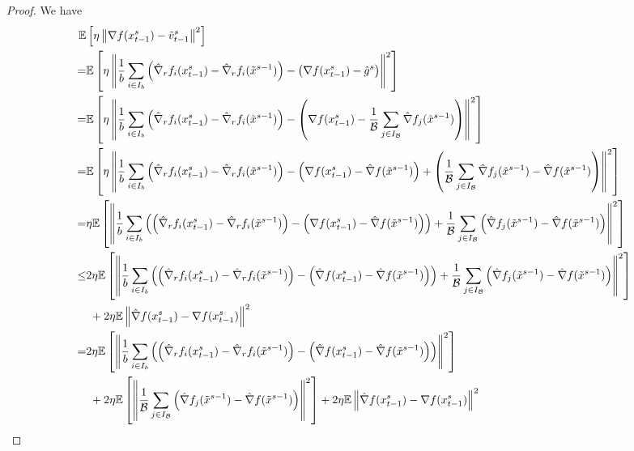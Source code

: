 \documentclass{article}
\newcommand*{\E}{\mathbb{E}}
\newcommand{\norm}[1]{\left\lVert#1\right\rVert}
\theoremstyle{definition}
\theoremstyle{remark}
\begin{document}
\begin{proof}
We have
\begin{align}
  \E&\left[\eta\norm{\nabla f(x_{t-1}^s)-{\tilde{v}_{t-1}^s}}^2\right]\notag\\
   =&\E\left[\eta\norm{\frac{1}{b}\sum_{i\in I_b}\left(\hat{\nabla}_r f_i(x_{t-1}^s)-\hat{\nabla}_r f_i(\tilde{x}^{s-1})\right) - \left(\nabla f(x_{t-1}^s)-\hat{g}^s\right)}^2\right]\notag\\
   =&\E\left[\eta\norm{\frac{1}{b}\sum_{i\in I_b}\left(\hat{\nabla}_r f_i(x_{t-1}^s)-\hat{\nabla}_r f_i(\tilde{x}^{s-1})\right) - \left(\nabla f(x_{t-1}^s)-\frac{1}{\mathcal{B}}\sum_{j\in I_{\mathcal{B}}}\hat{\nabla} f_j(\tilde{x}^{s-1})\right)}^2\right]\notag\\
   =&\notag\E\left[\eta\norm{\frac{1}{b}\sum_{i\in I_b}\left(\hat{\nabla}_r f_i(x_{t-1}^s)-\hat{\nabla}_r f_i(\tilde{x}^{s-1})\right) - \left(\nabla f(x_{t-1}^s) - \hat{\nabla} f(\tilde{x}^{s-1}) \right)+ \left(\frac{1}{\mathcal{B}}\sum_{j\in I_{\mathcal{B}}}\hat{\nabla} f_j(\tilde{x}^{s-1}) - \hat{\nabla} f(\tilde{x}^{s-1})\right)}^2\right]\\
   =&\notag\eta\E\left[\norm{\frac{1}{b}\sum_{i\in I_b}\left(\left(\hat{\nabla}_r f_i(x_{t-1}^s)-\hat{\nabla}_r f_i(\tilde{x}^{s-1})\right) - \left(\nabla f(x_{t-1}^s) - \hat{\nabla} f(\tilde{x}^{s-1}) \right)\right)+ \frac{1}{\mathcal{B}}\sum_{j\in I_{\mathcal{B}}}\left(\hat{\nabla} f_j(\tilde{x}^{s-1}) - \hat{\nabla} f(\tilde{x}^{s-1})\right)}^2\right]\\
   \leq &\notag2\eta\E\left[\norm{\frac{1}{b}\sum_{i\in I_b}\left(\left(\hat{\nabla}_r f_i(x_{t-1}^s)-\hat{\nabla}_r f_i(\tilde{x}^{s-1})\right) - \left(\hat{\nabla} f(x_{t-1}^s) - \hat{\nabla} f(\tilde{x}^{s-1}) \right)\right)+ \frac{1}{\mathcal{B}}\sum_{j\in I_{\mathcal{B}}}\left(\hat{\nabla} f_j(\tilde{x}^{s-1}) - \hat{\nabla} f(\tilde{x}^{s-1})\right)}^2\right]\\
   &\,\, + 2\eta \E \norm{\hat{\nabla} f(x_{t-1}^s)-\nabla f(x_{t-1}^s)}^2\label{RandSGE-var-estimate-lem-1}\\
    = &\notag 2 \eta\E\left[\norm{\frac{1}{b}\sum_{i\in I_b}\left(\left(\hat{\nabla}_r f_i(x_{t-1}^s)-\hat{\nabla}_r f_i(\tilde{x}^{s-1})\right) - \left(\hat{\nabla} f(x_{t-1}^s) - \hat{\nabla} f(\tilde{x}^{s-1}) \right)\right)}^2\right]\\
   &\,\, +2 \eta \E \left[ \norm{\frac{1}{\mathcal{B}}\sum_{j\in I_{\mathcal{B}}}\left(\hat{\nabla} f_j(\tilde{x}^{s-1}) - \hat{\nabla} f(\tilde{x}^{s-1})\right)}^2\right]+ 2\eta \E \norm{\hat{\nabla} f(x_{t-1}^s)-\nabla f(x_{t-1}^s)}^2\label{RandSGE-var-estimate-lem-2}\\

\end{align}
\end{proof}
\end{document}
